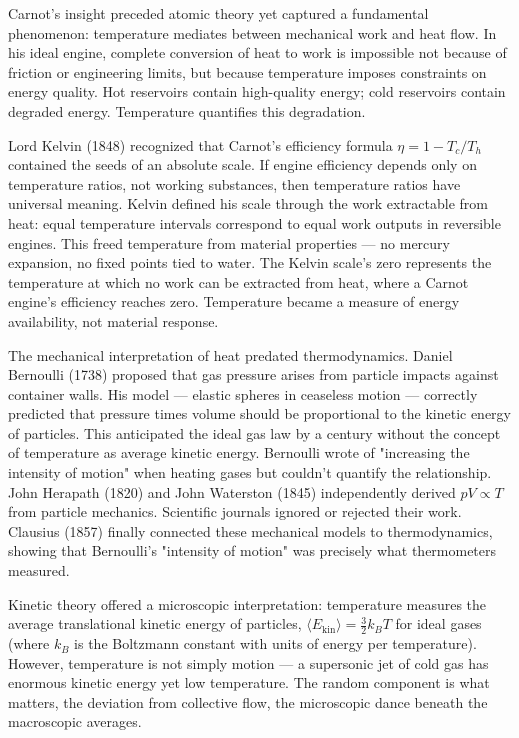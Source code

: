 Carnot's insight preceded atomic theory yet captured a fundamental phenomenon: temperature mediates between mechanical work and heat flow. In his ideal engine, complete conversion of heat to work is impossible not because of friction or engineering limits, but because temperature imposes constraints on energy quality. Hot reservoirs contain high-quality energy; cold reservoirs contain degraded energy. Temperature quantifies this degradation.

Lord Kelvin (1848) recognized that Carnot's efficiency formula $\eta = 1 - T_c/T_h$ contained the seeds of an absolute scale. If engine efficiency depends only on temperature ratios, not working substances, then temperature ratios have universal meaning. Kelvin defined his scale through the work extractable from heat: equal temperature intervals correspond to equal work outputs in reversible engines. This freed temperature from material properties — no mercury expansion, no fixed points tied to water. The Kelvin scale's zero represents the temperature at which no work can be extracted from heat, where a Carnot engine's efficiency reaches zero. Temperature became a measure of energy availability, not material response.

The mechanical interpretation of heat predated thermodynamics. Daniel Bernoulli (1738) proposed that gas pressure arises from particle impacts against container walls. His model — elastic spheres in ceaseless motion — correctly predicted that pressure times volume should be proportional to the kinetic energy of particles. This anticipated the ideal gas law by a century without the concept of temperature as average kinetic energy. Bernoulli wrote of "increasing the intensity of motion" when heating gases but couldn't quantify the relationship. John Herapath (1820) and John Waterston (1845) independently derived $pV \propto T$ from particle mechanics. Scientific journals ignored or rejected their work. Clausius (1857) finally connected these mechanical models to thermodynamics, showing that Bernoulli's "intensity of motion" was precisely what thermometers measured.

Kinetic theory offered a microscopic interpretation: temperature measures the average translational kinetic energy of particles, $ \langle E_{\text{kin}} \rangle = \frac{3}{2}k_B T $ for ideal gases (where $k_B$ is the Boltzmann constant with units of energy per temperature). However, temperature is not simply motion — a supersonic jet of cold gas has enormous kinetic energy yet low temperature. The random component is what matters, the deviation from collective flow, the microscopic dance beneath the macroscopic averages.

